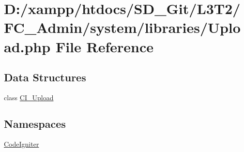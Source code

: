 \hypertarget{_admin_2system_2libraries_2_upload_8php}{}\section{D\+:/xampp/htdocs/\+S\+D\+\_\+\+Git/\+L3\+T2/\+F\+C\+\_\+\+Admin/system/libraries/\+Upload.php File Reference}
\label{_admin_2system_2libraries_2_upload_8php}
\subsection*{Data Structures}
\begin{DoxyCompactItemize}
\item 
class \hyperlink{class_c_i___upload}{C\+I\+\_\+\+Upload}
\end{DoxyCompactItemize}
\subsection*{Namespaces}
\begin{DoxyCompactItemize}
\item 
 \hyperlink{namespace_code_igniter}{Code\+Igniter}
\end{DoxyCompactItemize}
